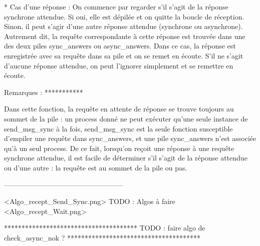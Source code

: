 * Cas d'une réponse :
  On commence par regarder s'il s'agit de la réponse synchrone attendue. Si oui, elle est dépilée et
  on quitte la boucle de réception.
  Sinon, il peut s'agir d'une autre réponse attendue (synchrone ou asynchrone). Autrement dit, la
  requête correspondante à cette réponse est trouvée dans une des deux piles sync_answers ou
  async_answers.
  Dans ce cas, la réponse est enregistrée avec sa requête dans sa pile et on se remet en écoute.
  S'il ne s'agit d'aucune réponse attendue, on peut l'ignorer simplement et se remettre en écoute.

Remarques :
***********

Dans cette fonction, la requête en attente de réponse se trouve toujours au sommet de la pile :
un process donné ne peut exécuter qu'une seule instance de send_msg_sync à la fois, send_msg_sync
est la seule fonction susceptible d'empiler une requête dans sync_answers, et une pile sync_answers
n'est associée qu'à un seul process.
De ce fait, lorsqu'on reçoit une réponse à une requête synchrone attendue, il est facile de déterminer
s'il s'agit de la réponse attendue ou d'une autre : la requête est au sommet de la pile ou pas.


---------------------------------------------------

<Algo_recept_Send_Sync.png>   TODO : Algos à faire
<Algo_recept_Wait.png>

**************************************
TODO : faire algo de check_async_nok ?
**************************************
